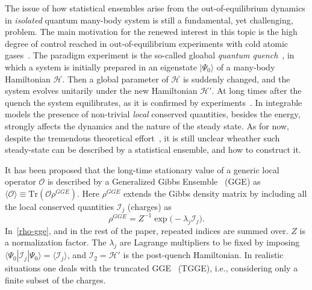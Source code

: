\documentclass[twocolumn,superscriptaddress,prb,10pt]{revtex4-1}
\begin{document}
The issue of how statistical ensembles arise from the out-of-equilibrium 
dynamics in {\it isolated} quantum many-body system is still a fundamental, 
yet challenging, problem. The main motivation for the renewed interest 
in this topic is the high degree of control reached in out-of-equilibrium 
experiments with cold atomic gases~\cite{bloch-2008,greiner-2002,kinoshita-2006,
hofferberth-2007,trotzky-2012,gring-2012,cheneau-2012,
schneider-2012,kunhert-2013,langen-2013,meinert-2013,fukuhara-2013,
ronzheimer-2013,braun-2014,langen-2015}. The paradigm experiment is the so-called gloabal 
{\it quantum quench}~\cite{polkovnikov-2011}, in which a system is initially 
prepared in an eigenstate $|\Psi_0\rangle$ of a many-body Hamiltonian ${\mathcal 
H}$. Then a global parameter of ${\mathcal H}$ is suddenly changed, and the 
system evolves unitarily under the new Hamiltonian ${\mathcal H}'$. 
At long times after the quench the system equilibrates, as it is confirmed by 
experiments~\cite{kinoshita-2006}. In integrable models the 
presence of non-trivial {\it local} conserved quantities, besides the energy, 
strongly affects the dynamics and the nature of the steady state. As for now,  
despite the tremendous theoretical effort~\cite{calabrese-2006,rigol-2007,calabrese-2007,
kollath-2007,manmana-2007,rigol-2008,cramer-2008,barthel-2008,kollar-2008,moeckel-2008,
iucci-2009,rossini-2009,barmettler-2009,biroli-2010,rossini-2010,fioretto-2010,
gogolin-2011,banuls-2011,calabrese-2011,rigol-2011,calabrese-2012,caux-2012,essler-2012,
cazalilla-2012,mossel-2012a,collura-2013,mussardo-2013,caux-2013,fagotti-2013a,fagotti-2013,
sotiriadis-2014,fagotti-2014,essler-2014,goldstein-2014,de-nardis-2014,wright-2014,
pozsgay-2014,wouters-2014,mestyian-2015,ilievski-2015a}, 
it is still unclear wheather such steady-state can be described by a statistical 
ensemble, and how to construct it. 

It has been proposed that the long-time stationary value of a generic 
local operator ${\mathcal O}$ is described by a Generalized Gibbs Ensemble~\cite{
rigol-2007,rigol-2008} (GGE) as $\langle{\mathcal O}\rangle\equiv\textrm{Tr}({\mathcal O}
\rho^{GGE})$. Here $\rho^{GGE}$ extends the Gibbs density matrix by including  all 
the local conserved quantities $ {\mathcal I}_j$ (charges) as 
%
\begin{equation}
\rho^{GGE}=Z^{-1}\exp\big(-\lambda_j{\mathcal I}_j\big). 
\label{rho-gge}
\end{equation}
%
In~\eqref{rho-gge}, and in the rest of the paper, repeated indices are summed over. 
$Z$ is a normalization factor. The $\lambda_j$ are Lagrange multipliers to be fixed 
by imposing $\langle\Psi_0|{\mathcal I}_j|\Psi_0\rangle=\langle{\mathcal 
I}_j\rangle$, and ${\mathcal I}_2={\mathcal H}'$ is the post-quench Hamiltonian. 
In realistic situations one deals with the truncated GGE~\cite{fagotti-2013} (TGGE), 
i.e., considering only a finite subset of the charges. 
\end{document}
